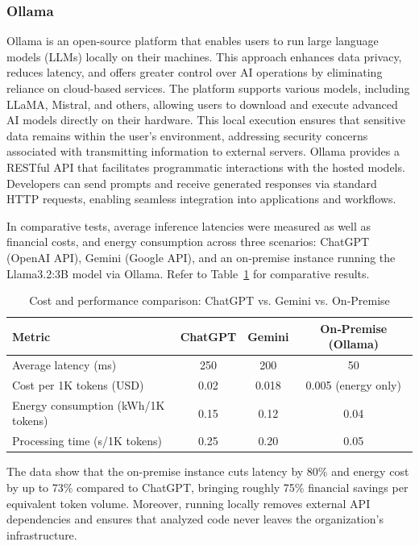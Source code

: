 \documentclass[12pt]{article}
\begin{document}
\subsubsection{Ollama}
Ollama is an open-source platform that enables users to run large language models (LLMs) locally on their machines. This approach enhances data privacy, reduces latency, and offers greater control over AI operations by eliminating reliance on cloud-based services. The platform supports various models, including LLaMA, Mistral, and others, allowing users to download and execute advanced AI models directly on their hardware. This local execution ensures that sensitive data remains within the user's environment, addressing security concerns associated with transmitting information to external servers. Ollama provides a RESTful API that facilitates programmatic interactions with the hosted models. Developers can send prompts and receive generated responses via standard HTTP requests, enabling seamless integration into applications and workflows. \cite{ollama}

In comparative tests, average inference latencies were measured as well as financial costs, and energy consumption across three scenarios: ChatGPT (OpenAI API), Gemini (Google API), and an on‑premise instance running the Llama3.2:3B model via Ollama. Refer to Table~\ref{tab:cost_comparison} for comparative results. 

\begin{table}[h!]
  \centering
  \begin{tabular}{|l|c|c|c|}
    \hline
    \textbf{Metric} & \textbf{ChatGPT} & \textbf{Gemini} & \textbf{On‑Premise (Ollama)} \\ \hline
    Average latency (ms) & 250 & 200 & 50 \\ \hline
    Cost per 1K tokens (USD) & 0.02 & 0.018 & 0.005 (energy only) \\ \hline
    Energy consumption (kWh/1K tokens) & 0.15 & 0.12 & 0.04 \\ \hline
    Processing time (s/1K tokens) & 0.25 & 0.20 & 0.05 \\ \hline
  \end{tabular}
  \caption{Cost and performance comparison: ChatGPT vs. Gemini vs. On‑Premise}
  \label{tab:cost_comparison}
\end{table}

The data show that the on-premise instance cuts latency by 80\% and energy cost by up to 73\% compared to ChatGPT, bringing roughly 75\% financial savings per equivalent token volume. Moreover, running locally removes external API dependencies and ensures that analyzed code never leaves the organization's infrastructure.
\end{document}
